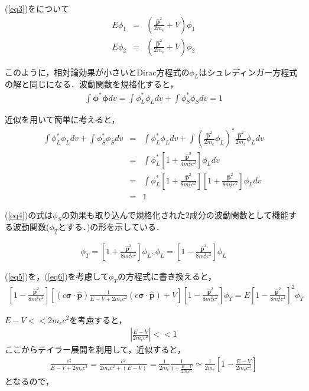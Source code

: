 \documentclass[10pt]{ujarticle}
\begin{document}
(\ref{eq3})をについて
\begin{eqnarray}
  E\phi_1 &=& \left( \frac{\bm{\hat{p}}^2}{2m_e} + V \right) \phi_1 \\
  E\phi_2 &=& \left( \frac{\bm{\hat{p}}^2}{2m_e} + V \right) \phi_2
\end{eqnarray}

このように，相対論効果が小さいとDirac方程式の$\phi_L$はシュレディンガー方程式の解と同じになる．波動関数を規格化すると，
\begin{eqnarray*}
  \int \bm{\phi}^* \bm{\phi} dv = \int \phi_L^* \phi_L dv + \int \phi_S^* \phi_S dv = 1
\end{eqnarray*}

近似を用いて簡単に考えると，
\begin{eqnarray}
\label{eq4}
  \int \phi_L^* \phi_L dv + \int \phi_S^* \phi_S dv &=& \int \phi_L^* \phi_L dv + \int \left( \frac{\bm{\hat{p}}^2}{2m_e} \phi_L \right) ^*\frac{\bm{\hat{p}}^2}{2m_e} \phi_L dv \nonumber \\
  &=& \int \phi_L^* \left[ 1+ \frac{\bm{\hat{p}}^2}{4m_e^2 c^2} \right] \phi_L dv \nonumber \\
  &=& \int \phi_L^* \left[ 1+ \frac{\bm{\hat{p}}^2}{8m_e^2 c^2} \right] \left[ 1+ \frac{\bm{\hat{p}}^2}{8m_e^2 c^2} \right] \phi_L dv \nonumber \\
  &=& 1
\end{eqnarray}

(\ref{eq4})の式は$\phi_S$の効果も取り込んで規格化された2成分の波動関数として機能する波動関数($\phi_T$とする．)の形を示している．

\begin{eqnarray}
  \label{eq6}
  \phi_T = \left[ 1+ \frac{\bm{\hat{p}}^2}{8m_e^2 c^2} \right] \phi_L, \phi_L=\left[ 1- \frac{\bm{\hat{p}}^2}{8m_e^2 c^2} \right] \phi_L
\end{eqnarray}

(\ref{eq5})を，(\ref{eq6})を考慮して$\phi_T$の方程式に書き換えると，
\begin{eqnarray}
\left[ 1- \frac{\bm{\hat{p}}^2}{8m_e^2 c^2} \right] \left[(c \bm{\sigma} \cdot \bm{\hat{p}} ) \frac{1}{E-V+2m_e c^2} (c\bm{\sigma} \cdot \bm{\hat{p}})+V \right] \left[ 1- \frac{\bm{\hat{p}}^2}{8m_e^2 c^2} \right] \phi_T = E \left[ 1- \frac{\bm{\hat{p}}^2}{8m_e^2 c^2} \right] ^2 \phi_T
\end{eqnarray}

$E-V<<2m_e c^2$を考慮すると，
\begin{eqnarray}
  \left| \frac{E-V}{2m_e c^2} \right| << 1 
\end{eqnarray}
ここからテイラー展開を利用して，近似すると，
\begin{eqnarray}
  \frac{c^2}{E-V+2m_e c^2} = \frac{c^2}{2m_e c^2 + (E-V)} = \frac{1}{2m_e} \frac{1}{1+\frac{E-V}{2m_e c^2}} \simeq \frac{1}{2m_e} \left[ 1- \frac{E-V}{2m_e c^2} \right]
\end{eqnarray}
となるので，
\end{document}
